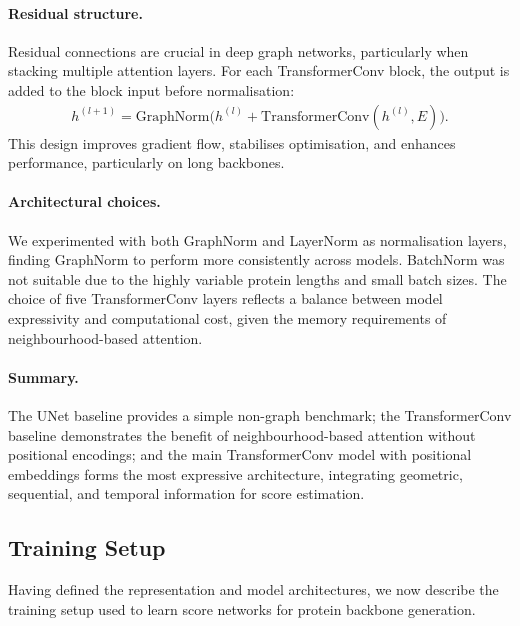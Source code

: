 \documentclass[a4paper,12pt]{article}
\begin{document}
\paragraph{Residual structure.}
Residual connections are crucial in deep graph networks, particularly when stacking multiple attention layers. 
For each TransformerConv block, the output is added to the block input before normalisation:
\begin{align*}
    h^{(l+1)} = \mathrm{GraphNorm}\!\big(h^{(l)} + \mathrm{TransformerConv}(h^{(l)}, E)\big).
\end{align*}
This design improves gradient flow, stabilises optimisation, and enhances performance, particularly on long backbones.

\paragraph{Architectural choices.}
We experimented with both GraphNorm and LayerNorm as normalisation layers, finding GraphNorm to perform more consistently across models. 
BatchNorm was not suitable due to the highly variable protein lengths and small batch sizes. 
The choice of five TransformerConv layers reflects a balance between model expressivity and computational cost, given the memory requirements of neighbourhood-based attention. 

\paragraph{Summary.}
The UNet baseline provides a simple non-graph benchmark; the TransformerConv baseline demonstrates the benefit of neighbourhood-based attention without positional encodings; and the main TransformerConv model with positional embeddings forms the most expressive architecture, integrating geometric, sequential, and temporal information for score estimation.

\subsection{Training Setup}\label{subsec:training-setup}
Having defined the representation and model architectures, we now describe the training setup used to learn score networks for protein backbone generation.
\end{document}
